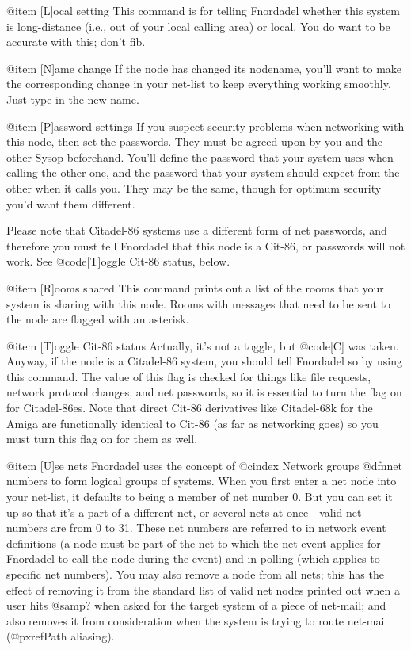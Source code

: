 @item [L]ocal setting
This command is for telling Fnordadel whether this
system is long-distance (i.e., out of your local calling area) or local.
You do want to be accurate with this; don't fib.

@item [N]ame change
If the node has changed its nodename, you'll want to
make the corresponding change in your net-list to keep everything
working smoothly.  Just type in the new name.

@item [P]assword settings
If you suspect security problems when networking with this
node, then set the passwords.  They must be agreed upon by you and
the other Sysop beforehand.  You'll define the password that your
system uses when calling the other one, and the password that your
system should expect from the other when it calls you.  They may be
the same, though for optimum security you'd want them different.

Please note that Citadel-86 systems use a different form of
net passwords, and therefore you must tell Fnordadel that this node is a
Cit-86, or passwords will not work.  See @code{[T]oggle Cit-86 status}, below.

@item [R]ooms shared
This command prints out a list of the rooms that your
system is sharing with this node.  Rooms with messages that need
to be sent to the node are flagged with an asterisk.

@item [T]oggle Cit-86 status
Actually, it's not a toggle, but @code{[C]} was taken.  Anyway,
if the node is a Citadel-86 system, you should tell Fnordadel
so by using this command.  The value of this flag is checked for
things like file requests, network protocol changes, and net
passwords, so it is
essential to turn the flag on for Citadel-86es.  Note that direct
Cit-86 derivatives like Citadel-68k for the Amiga are functionally
identical to Cit-86 (as far as networking goes) so you must turn
this flag on for them as well.

@item [U]se nets
Fnordadel uses the concept of
@cindex Network groups
@dfn{net numbers} to form logical groups of
systems.
When you first enter a net node into your net-list, it
defaults to being a member of net number 0.  But you can set it
up so that it's a part of a different net, or several nets at
once---valid net numbers are from 0 to 31.  These net numbers are
referred to in network event definitions (a node must be part of
the net to which the net event applies for Fnordadel to call the
node during the event) and in polling (which applies to specific
net numbers).  You may also remove a node from all nets; this
has the effect of removing it from the standard list of valid net
nodes printed out when a user hits @samp{?} when asked for the target
system of a piece of net-mail; and also removes it from
consideration when the system is trying to route net-mail
(@pxref{Path aliasing}).

